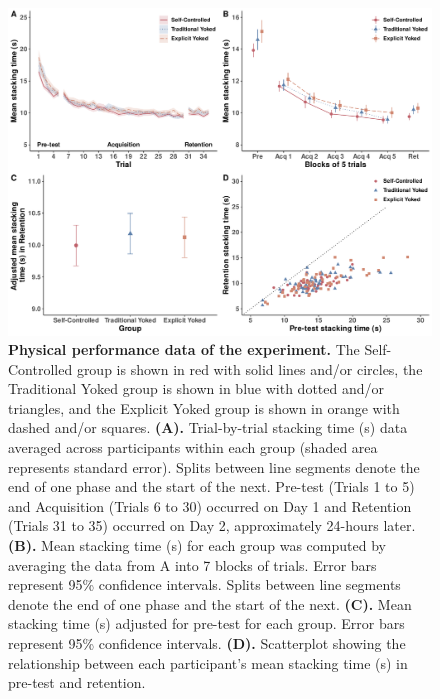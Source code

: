 \documentclass[
  english,
  doc, donotrepeattitle,floatsintext]{apa7}
\begin{document}
\begin{figure}

{\centering \includegraphics[height=0.51\textheight]{../../figs/fig1} 

}

\caption{\textbf{Physical performance data of the experiment.} The Self-Controlled group is shown in red with solid lines and/or circles, the Traditional Yoked group is shown in blue with dotted and/or triangles, and the Explicit Yoked group is shown in orange with dashed and/or squares. \textbf{(A).} Trial-by-trial stacking time (s) data averaged across participants within each group (shaded area represents standard error). Splits between line segments denote the end of one phase and the start of the next. Pre-test (Trials 1 to 5) and Acquisition (Trials 6 to 30) occurred on Day 1 and Retention (Trials 31 to 35) occurred on Day 2, approximately 24-hours later. \textbf{(B).} Mean stacking time (s) for each group was computed by averaging the data from A into 7 blocks of trials. Error bars represent 95\% confidence intervals. Splits between line segments denote the end of one phase and the start of the next. \textbf{(C).} Mean stacking time (s) adjusted for pre-test for each group. Error bars represent 95\% confidence intervals. \textbf{(D).} Scatterplot showing the relationship between each participant's mean stacking time (s) in pre-test and retention.}\label{fig:fig1}
\end{figure}

\newpage
\end{document}
